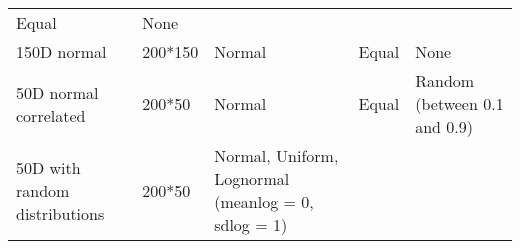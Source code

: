 \documentclass[]{article}
\begin{document}
\begin{longtable}[]{@{}lllll@{}}
\begin{minipage}[t]{0.21\columnwidth}
Equal\strut
\end{minipage} & \begin{minipage}[t]{0.13\columnwidth}\raggedright\strut
None\strut
\end{minipage}\tabularnewline
\begin{minipage}[t]{0.12\columnwidth}\raggedright\strut
150D normal\strut
\end{minipage} & \begin{minipage}[t]{0.12333\columnwidth}\raggedright\strut
200*150\strut
\end{minipage} & \begin{minipage}[t]{0.31\columnwidth}\raggedright\strut
Normal\strut
\end{minipage} & \begin{minipage}[t]{0.21\columnwidth}\raggedright\strut
Equal\strut
\end{minipage} & \begin{minipage}[t]{0.13\columnwidth}\raggedright\strut
None\strut
\end{minipage}\tabularnewline
\begin{minipage}[t]{0.12\columnwidth}\raggedright\strut
50D normal correlated\strut
\end{minipage} & \begin{minipage}[t]{0.12333\columnwidth}\raggedright\strut
200*50\strut
\end{minipage} & \begin{minipage}[t]{0.31\columnwidth}\raggedright\strut
Normal\strut
\end{minipage} & \begin{minipage}[t]{0.21\columnwidth}\raggedright\strut
Equal\strut
\end{minipage} & \begin{minipage}[t]{0.13\columnwidth}\raggedright\strut
Random (between 0.1 and 0.9)\strut
\end{minipage}\tabularnewline
\begin{minipage}[t]{0.12\columnwidth}\raggedright\strut
50D with random distributions\strut
\end{minipage} & \begin{minipage}[t]{0.12333\columnwidth}\raggedright\strut
200*50\strut
\end{minipage} & \begin{minipage}[t]{0.31\columnwidth}\raggedright\strut
Normal, Uniform, Lognormal (meanlog = 0, sdlog = 1)\strut
\end{minipage} & \begin{minipage}[t]{0.21\columnwidth}\raggedright\strut

\end{minipage}
\end{longtable}
\end{document}
